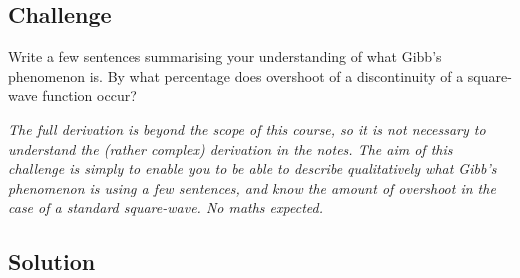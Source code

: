 \subsection*{Challenge}
Write a few sentences summarising your understanding of what Gibb's phenomenon is. By what percentage does overshoot of a discontinuity of a square-wave function occur?

\emph{The full derivation is beyond the scope of this course, so it is not necessary to understand the (rather complex) derivation in the notes. The aim of this challenge is simply to enable you to be able to describe qualitatively what Gibb's phenomenon is using a few sentences, and know the amount of overshoot in the case of a standard square-wave. No maths expected.}

\subsection*{Solution}
\six{\%}


\timebox








